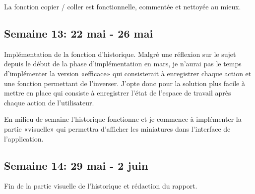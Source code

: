 La fonction copier / coller est fonctionnelle, commentée et nettoyée au mieux.
\subsection{Semaine 13: 22 mai - 26 mai}
Implémentation de la fonction d'historique. Malgré une réflexion sur le sujet depuis le début de la phase d'implémentation en mars, je n'aurai pas le temps d'implémenter la version «efficace» qui consisterait à enregistrer chaque action et une fonction permettant de l'inverser. J'opte donc pour la solution plus facile à mettre en place qui consiste à enregistrer l'état de l'espace de travail après chaque action de l'utilisateur.

En milieu de semaine l'historique fonctionne et je commence à implémenter la partie «visuelle» qui permettra d'afficher les miniatures dans l'interface de l'application.
\subsection{Semaine 14: 29 mai - 2 juin}
Fin de la partie visuelle de l'historique et rédaction du rapport.
